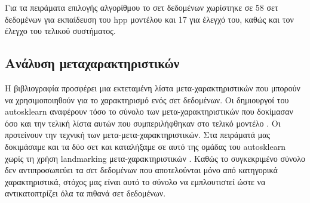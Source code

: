 \documentclass[]{article}
\numberwithin{equation}{section}		%
\numberwithin{figure}{section}			%
\numberwithin{table}{section}				%
\begin{document}
    Για τα πειράματα επιλογής αλγορίθμου το σετ δεδομένων χωρίστηκε σε 58 σετ δεδομένων για εκπαίδευση του \gls{hpp} μοντέλου και 17 για έλεγχό του, καθώς και τον έλεγχο του τελικού συστήματος.
    
    \subsection{Ανάλυση μεταχαρακτηριστικών}
    Η βιβλιογραφία προσφέρει μια εκτεταμένη λίστα μετα-χαρακτηριστικών που μπορούν να χρησιμοποιηθούν για το χαρακτηρισμό ενός σετ δεδομένων. Oι δημιουργοί του autosklearn αναφέρουν τόσο το σύνολο των μετα-χαρακτηριστικών που δοκίμασαν \citep{Feurer:2014:UMI:3015544.3015549} όσο και την τελική λίστα αυτών που συμπεριλήφθηκαν στο τελικό μοντέλο \citep{autosklearn}. Οι \citet{Reif_meta2-features:} προτείνουν την τεχνική των μετα-μετα-χαρακτηριστικών. Στα πειράματά μας δοκιμάσαμε και τα δύο σετ και καταλήξαμε σε αυτό της ομάδας του autosklearn χωρίς τη χρήση landmarking μετα-χαρακτηριστικών . Καθώς το συγκεκριμένο σύνολο δεν αντιπροσωπεύει τα σετ δεδομένων που αποτελούνται μόνο από κατηγορικά χαρακτηριστικά, στόχος μας είναι αυτό το σύνολο να εμπλουτιστεί ώστε να αντικατοπτρίζει όλα τα πιθανά σετ δεδομένων.
    
\end{document}
